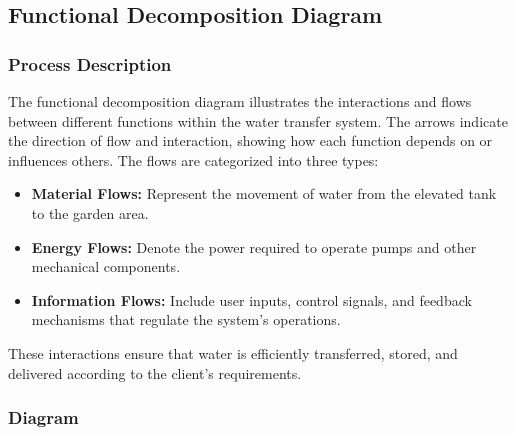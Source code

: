 \documentclass{article}
\begin{document}
\subsection{Functional Decomposition Diagram}
\subsubsection{Process Description}
The functional decomposition diagram illustrates the interactions and flows between different functions within the water transfer system. The arrows indicate the direction of flow and interaction, showing how each function depends on or influences others. The flows are categorized into three types:

\begin{itemize}
    \item \textbf{Material Flows:} Represent the movement of water from the elevated tank to the garden area.
    \item \textbf{Energy Flows:} Denote the power required to operate pumps and other mechanical components.
    \item \textbf{Information Flows:} Include user inputs, control signals, and feedback mechanisms that regulate the system's operations.
\end{itemize}

These interactions ensure that water is efficiently transferred, stored, and delivered according to the client's requirements.



\subsubsection{Diagram}
\end{document}
